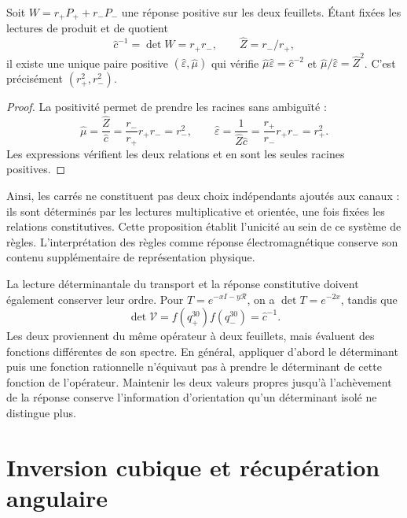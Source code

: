 \begin{proposition}
Soit $W=r_+P_++r_-P_-$ une réponse positive sur les deux feuillets.
Étant fixées les lectures de produit et de quotient
\[
 \widehat c^{-1}=\det W=r_+r_-,
 \qquad \widehat Z=r_-/r_+,
\]
il existe une unique paire positive $(\widehat\varepsilon,\widehat\mu)$
qui vérifie
$\widehat\mu\widehat\varepsilon=\widehat c^{-2}$ et
$\widehat\mu/\widehat\varepsilon=\widehat Z^2$.
C’est précisément $(r_+^2,r_-^2)$.
\end{proposition}
\begin{proof}
La positivité permet de prendre les racines sans ambiguïté :
\[
 \widehat\mu=\frac{\widehat Z}{\widehat c}
 =\frac{r_-}{r_+}r_+r_-=r_-^2,\qquad
 \widehat\varepsilon=\frac1{\widehat Z\widehat c}
 =\frac{r_+}{r_-}r_+r_-=r_+^2.
\]
Les expressions vérifient les deux relations et en sont les seules racines
positives.
\end{proof}

Ainsi, les carrés ne constituent pas deux choix indépendants ajoutés
aux canaux : ils sont déterminés par les lectures multiplicative et
orientée, une fois fixées les relations constitutives. Cette proposition
établit l’unicité au sein de ce système de règles. L’interprétation
des règles comme réponse électromagnétique conserve son contenu
supplémentaire de représentation physique.

La lecture déterminantale du transport et la réponse constitutive
doivent également conserver leur ordre. Pour $T=e^{-xI-y\mathcal R}$, on a
$\det T=e^{-2x}$, tandis que
\[
 \det\mathcal V=f(q_+^{30})f(q_-^{30})=\widehat c^{-1}.
\]
Les deux proviennent du même opérateur à deux feuillets, mais évaluent des fonctions différentes de son spectre. En général, appliquer d'abord le déterminant puis une fonction rationnelle n'équivaut pas à prendre le déterminant de cette fonction de l'opérateur. Maintenir les deux valeurs propres jusqu'à l'achèvement de la réponse conserve l'information d'orientation qu'un déterminant isolé ne distingue plus.

\section{Inversion cubique et récupération angulaire}

